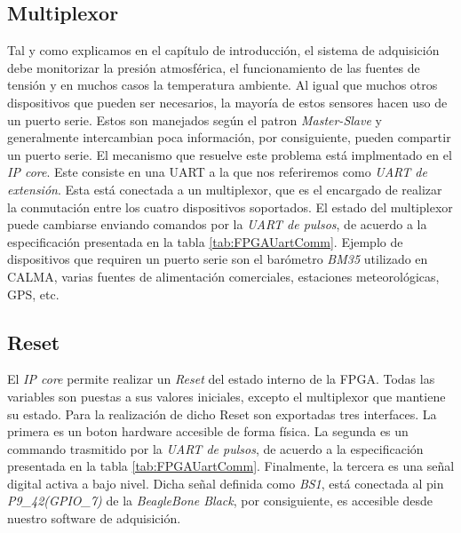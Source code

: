 	\subsection{Multiplexor}
		Tal y como explicamos en el capítulo de introducción, el sistema de adquisición debe monitorizar la presión atmosférica, el
		funcionamiento de las fuentes de tensión y en muchos casos la temperatura ambiente. Al igual que muchos otros dispositivos que pueden
		ser necesarios, la mayoría de estos sensores hacen uso de un puerto serie. Estos son manejados según el patron \emph{Master-Slave} y
		generalmente intercambian poca información, por consiguiente, pueden compartir un puerto serie. El mecanismo que resuelve este
		problema está implmentado en el \emph{IP core}. Este consiste en una UART a la que nos referiremos como \emph{UART de extensión}. Esta
		está conectada a un multiplexor, que es el encargado de realizar la conmutación entre los cuatro dispositivos soportados. El estado
		del multiplexor puede cambiarse enviando comandos por la \emph{UART de pulsos}, de acuerdo a la especificación presentada en la tabla
		\ref{tab:FPGAUartComm}. Ejemplo de dispositivos que requiren un puerto serie son el barómetro \emph{BM35} utilizado en CALMA, varias
		fuentes de alimentación comerciales, estaciones meteorológicas, GPS, etc.
	\subsection{Reset}
		El \emph{IP core} permite realizar un \emph{Reset} del estado interno de la FPGA. Todas las variables son puestas a sus valores iniciales,
		excepto el multiplexor que mantiene su estado. Para la realización de dicho Reset son exportadas tres interfaces. La primera es un
		boton hardware accesible de forma física. La segunda es un commando trasmitido por la \emph{UART de pulsos}, de acuerdo a la
		especificación presentada en la tabla \ref{tab:FPGAUartComm}. Finalmente, la tercera es una señal digital activa a bajo nivel. Dicha
		señal definida como \emph{BS1}, está conectada al pin \emph{P9\_42(GPIO\_7)} de la \emph{BeagleBone Black}, por consiguiente, es accesible
		desde nuestro software de adquisición.

